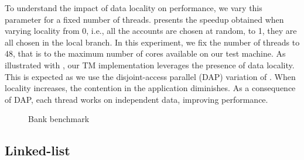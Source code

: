 To understand the impact of data locality on performance, we vary this parameter for a fixed number of threads.
 presents the speedup obtained when varying locality from 0, i.e., all the accounts are chosen at random, to 1, they are all chosen in the local branch.
In this experiment, we fix the number of threads to 48, that is to the maximum number of cores available on our test machine.
As illustrated with , our TM implementation leverages the presence of data locality.
This is expected as we use the disjoint-access parallel (DAP) variation of .
When locality increases, the contention in the application diminishes.
As a consequence of DAP, each thread works on independent data, improving performance.

\begin{figure}[!t]
  \centering
  \caption{
    Bank benchmark
  }
\end{figure}

\subsection{Linked-list}


